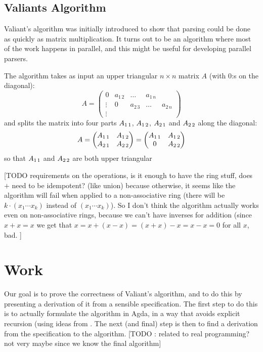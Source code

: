 \documentclass{article}
\begin{document}
\subsection{Valiants Algorithm}
Valiant's algorithm was initially introduced to show that parsing could be done as quickly as matrix multiplication. It turns out to be an algorithm where most of the work happens in parallel, and this might be useful for developing parallel parsers.

The algorithm takes as input an upper triangular $n \times n$ matrix $A$ (with $0$:s on the diagonal): 
\begin{equation}
A = 
\begin{pmatrix}
0 & a_{1\, 2} & \hdots & a_{1\, n} \\
\vdots & 0 & a_{2\,3} &  \hdots & a_{2\,n}\\
\vdots &
\end{pmatrix}
\end{equation}
and splits the matrix into four parts $A_{1\,1}$, $A_{1\,2}$, $A_{2\,1}$ and $A_{2\,2}$ along the diagonal: 
\begin{equation}
A = \begin{pmatrix}
  A_{1\,1} & A_{1\,2} \\
  A_{2\,1} & A_{2\,2}
\end{pmatrix} = \begin{pmatrix}
  A_{1\,1} & A_{1\,2} \\
  0 & A_{2\,2}
\end{pmatrix}
\end{equation}
so that $A_{1\,1}$ and $A_{2\,2}$ are both upper triangular

[TODO requirements on the operations, is it enough to have the ring stuff, does $+$ need to be idempotent? (like union) because otherwise, it seems like the algorithm will fail when applied to a non-associative ring (there will be $k\cdot (x_1\cdots x_k)$ instead of $(x_1\cdots x_k)$). So I don't think the algorithm actually works even on non-associative rings, because we can't have inverses for addition (since $x + x = x$ we get that $x = x + (x - x) = (x + x) - x = x - x = 0$ for all $x$, bad. ]

\section{Work}
Our goal is to prove the correctness of Valiant's algorithm, and to do this by presenting a derivation of it from a sensible specification. The first step to do this is to actually formulate the algorithm in Agda, in a way that avoids explicit recursion (using ideas from \cite{AoP}. The next (and final) step is then to find a derivation from the specification to the algorithm. [TODO : related to real programming? not very maybe since we know the final algorithm]
\end{document}
